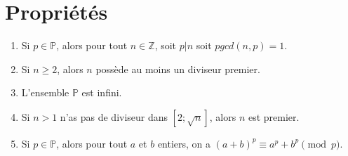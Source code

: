 \documentclass[../main.tex]{subfiles}
\begin{document}
\section{Propriétés}
\begin{tcolorbox}[title=Propostion 12.50, title filled=false, colframe=lightblue, colback=lightblue!10!white]
    \begin{enumerate}
        \item Si $p \in \mathbb{P}$, alors pour tout $n \in \mathbb{Z}$, soit $p|n$ soit $pgcd(n, p) = 1$. 
        \item Si $n \geq 2$, alors $n$ possède au moins un diviseur premier. 
        \item L'ensemble $\mathbb{P}$ est infini. 
        \item Si $n > 1$ n'as pas de diviseur dans $\left[ 2 ; \sqrt{n} \right]$, alors $n$ est premier. 
        \item Si $p \in \mathbb{P}$, alors pour tout $a$ et $b$ entiers, on a $(a + b)^p \equiv a^p + b^p \pmod p$.	
    \end{enumerate}
\end{tcolorbox}
\end{document}
